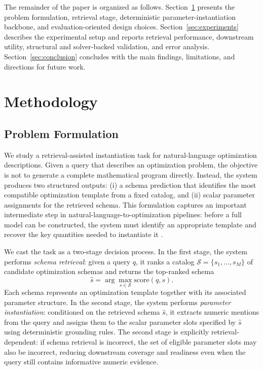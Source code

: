 \documentclass[pdflatex,sn-basic,Numbered]{sn-jnl}
\begin{document}
The remainder of the paper is organized as follows. Section~\ref{sec:method} presents the problem formulation, retrieval stage, deterministic parameter-instantiation backbone, and evaluation-oriented design choices. Section~\ref{sec:experiments} describes the experimental setup and reports retrieval performance, downstream utility, structural and solver-backed validation, and error analysis. Section~\ref{sec:conclusion} concludes with the main findings, limitations, and directions for future work.

\section{Methodology}
\label{sec:method}

\subsection{Problem Formulation}
\label{subsec:method_problem}

We study a retrieval-assisted instantiation task for natural-language optimization descriptions. Given a query that describes an optimization problem, the objective is not to generate a complete mathematical program directly. Instead, the system produces two structured outputs: (i) a schema prediction that identifies the most compatible optimization template from a fixed catalog, and (ii) scalar parameter assignments for the retrieved schema. This formulation captures an important intermediate step in natural-language-to-optimization pipelines: before a full model can be constructed, the system must identify an appropriate template and recover the key quantities needed to instantiate it \cite{nlp4lp_dataset,ramamonjison2023nl4opt,ahmaditeshnizi2024optimus_icml}.

We cast the task as a two-stage decision process. In the first stage, the system performs \emph{schema retrieval}: given a query $q$, it ranks a catalog $\mathcal{S}=\{s_1,\dots,s_M\}$ of candidate optimization schemas and returns the top-ranked schema
\[
\hat{s}=\arg\max_{s \in \mathcal{S}} \mathrm{score}(q,s).
\]
Each schema represents an optimization template together with its associated parameter structure. In the second stage, the system performs \emph{parameter instantiation}: conditioned on the retrieved schema $\hat{s}$, it extracts numeric mentions from the query and assigns them to the scalar parameter slots specified by $\hat{s}$ using deterministic grounding rules. The second stage is explicitly retrieval-dependent: if schema retrieval is incorrect, the set of eligible parameter slots may also be incorrect, reducing downstream coverage and readiness even when the query still contains informative numeric evidence.
\end{document}
